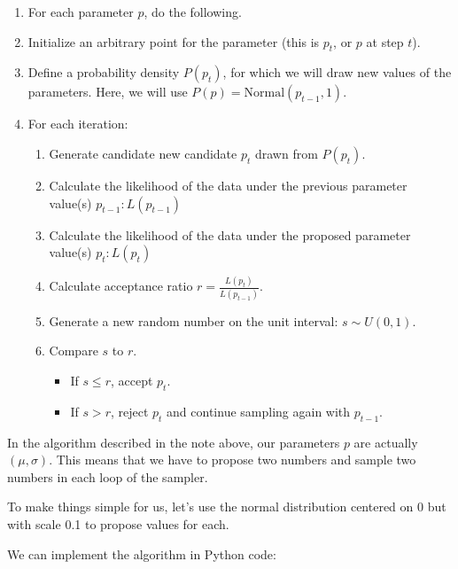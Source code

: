 \begin{enumerate}
\item For each parameter $p$, do the following.

\item Initialize an arbitrary point for the parameter (this is $p_t$, or $p$ at step $t$).

\item Define a probability density $P(p_t)$, for which we will draw new values of the parameters. Here, we will use $P(p)=\textrm{Normal}(p_{t-1},1)$.

\item For each iteration:
\begin{enumerate}

\item Generate candidate new candidate $p_t$ drawn from $P(p_t)$.

\item Calculate the likelihood of the data under the previous parameter value(s) $p_{t-1}: L(p_{t-1})$

\item Calculate the likelihood of the data under the proposed parameter value(s) $p_t: L(p_t)$

\item Calculate acceptance ratio $r=\frac{L(p_t)}{L(p_{t-1})}$.

\item Generate a new random number on the unit interval: $s\sim U(0,1)$.

\item Compare $s$ to $r$.
\begin{itemize}
\item If $s\leq r$, accept $p_t$.

\item If $s>r$, reject $p_t$ and continue sampling again with $p_{t-1}$.
\end{itemize}
\end{enumerate}
\end{enumerate}

In the algorithm described in the note above, our parameters $p$ are actually $(\mu,\sigma)$. This means that we have to propose two numbers and sample two numbers in each loop of the sampler.

To make things simple for us, let's use the normal distribution centered on 0
but with scale 0.1 to propose values for each.

We can implement the algorithm in Python code:

